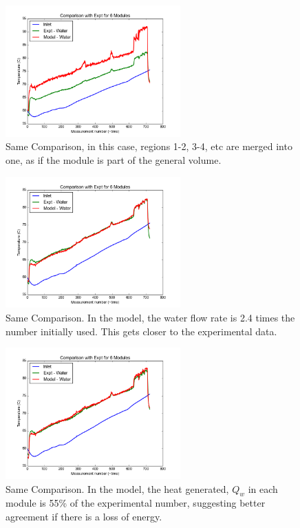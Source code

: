 \documentclass[11pt]{article}
\begin{document}
\begin{figure}[!ht]
\centering
\includegraphics[width=0.6\textwidth]{feb11_oneblock.png}
\caption{Same Comparison, in this case, regions 1-2, 3-4, etc are merged into one, as if the module is part of the general volume.}
\end{figure}
\begin{figure}[!ht]
\centering
\includegraphics[width=0.6\textwidth]{feb11_2_4water.png}
\caption{Same Comparison. In the model, the water flow rate is 2.4 times the number initially used. This gets closer to the experimental data.}
\end{figure}
\begin{figure}[!ht]
\centering
\includegraphics[width=0.6\textwidth]{feb11_55.png}
\caption{Same Comparison. In the model, the heat generated, $Q_w$ in each module is 55\% of the experimental number, suggesting better agreement if there is a loss of energy.}
\end{figure}
\clearpage
\newpage 
\end{document}
